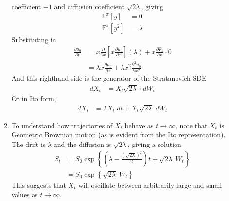 \documentclass[12pt]{article}
\theoremstyle{plain}
\theoremstyle{definition}
\theoremstyle{remark}
\begin{document}
\begin{enumerate}
\begin{enumerate}
        coefficient $-1$ and diffusion coefficient $\sqrt{2\lambda}$,
        giving
        \begin{align*}
          \mathbb{E}^\pi[y] &= 0 \\
          \mathbb{E}^\pi[y^2] &= \lambda
        \end{align*}
        Substituting in
        \begin{align*}
          \frac{\partial u_0}{\partial t}
          &=
           x\frac{\partial }{\partial x}
          \left[ x\frac{\partial u_0}{\partial x} \right]
          \left(\lambda\right)
          + x\frac{\partial \Psi_1}{\partial x}
          \cdot 0 \\
          &=
          \lambda x\frac{\partial u_0}{\partial x}
          + \lambda x^2\frac{\partial^2 u_0}{\partial x^2}
        \end{align*}
        And this righthand side is the generator of the
        Stratanovich SDE
        \begin{align*}
          dX_t &= X_t \sqrt{2\lambda} \circ dW_t
        \end{align*}
        Or in Ito form,
        \begin{align*}
          dX_t &= \lambda X_t \; dt + X_t \sqrt{2\lambda} \; dW_t
        \end{align*}

    \item %
      To understand how trajectories of $X_t$ behave as $t\rightarrow
      \infty$, note that $X_t$ is Geometric Brownian motion (as is
      evident from the Ito representation). The drift is $\lambda$ and
      the diffusion is $\sqrt{2\lambda}$, giving a solution
      \begin{align*}
        S_t
        &= S_0
        \exp
        \left\{
          \left(\lambda - \frac{(\sqrt{2\lambda})^2}{2}\right)t
          + \sqrt{2\lambda} \; W_t
        \right\} \\
        &= S_0
        \exp
        \left\{
          \sqrt{2\lambda} \; W_t
        \right\}
      \end{align*}
      This suggests that $X_t$ will oscillate between arbitrarily large
      and small values as $t\rightarrow \infty$.


\end{enumerate}
\end{enumerate}
\end{document}

